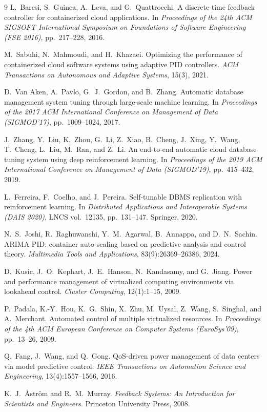 \documentclass[smallextended]{svjour3}
\begin{document}
\begin{thebibliography}{9}
L.\ Baresi, S.\ Guinea, A.\ Leva, and G.\ Quattrocchi.
\newblock A discrete-time feedback controller for containerized cloud
  applications.
\newblock In \emph{Proceedings of the 24th ACM SIGSOFT International
  Symposium on Foundations of Software Engineering (FSE 2016)}, pp.\
  217--228, 2016.

M.\ Sabuhi, N.\ Mahmoudi, and H.\ Khazaei.
\newblock Optimizing the performance of containerized cloud software
  systems using adaptive PID controllers.
\newblock \emph{ACM Transactions on Autonomous and Adaptive Systems},
  15(3), 2021.

D.\ Van Aken, A.\ Pavlo, G.\ J.\ Gordon, and B.\ Zhang.
\newblock Automatic database management system tuning through
  large-scale machine learning.
\newblock In \emph{Proceedings of the 2017 ACM International
  Conference on Management of Data (SIGMOD'17)}, pp.\ 1009--1024, 2017.

J.\ Zhang, Y.\ Liu, K.\ Zhou, G.\ Li, Z.\ Xiao, B.\ Cheng, J.\ Xing,
  Y.\ Wang, T.\ Cheng, L.\ Liu, M.\ Ran, and Z.\ Li.
\newblock An end-to-end automatic cloud database tuning system using
  deep reinforcement learning.
\newblock In \emph{Proceedings of the 2019 ACM International
  Conference on Management of Data (SIGMOD'19)}, pp.\ 415--432, 2019.

L.\ Ferreira, F.\ Coelho, and J.\ Pereira.
\newblock Self-tunable DBMS replication with reinforcement learning.
\newblock In \emph{Distributed Applications and Interoperable Systems
  (DAIS 2020)}, LNCS vol.\ 12135, pp.\ 131--147. Springer, 2020.

N.\ S.\ Joshi, R.\ Raghuwanshi, Y.\ M.\ Agarwal, B.\ Annappa, and
  D.\ N.\ Sachin.
\newblock ARIMA-PID: container auto scaling based on predictive
  analysis and control theory.
\newblock \emph{Multimedia Tools and Applications}, 83(9):26369--26386,
  2024.

D.\ Kusic, J.\ O.\ Kephart, J.\ E.\ Hanson, N.\ Kandasamy, and G.\ Jiang.
\newblock Power and performance management of virtualized computing
  environments via lookahead control.
\newblock \emph{Cluster Computing}, 12(1):1--15, 2009.

P.\ Padala, K.-Y.\ Hou, K.\ G.\ Shin, X.\ Zhu, M.\ Uysal, Z.\ Wang,
  S.\ Singhal, and A.\ Merchant.
\newblock Automated control of multiple virtualized resources.
\newblock In \emph{Proceedings of the 4th ACM European Conference on
  Computer Systems (EuroSys'09)}, pp.\ 13--26, 2009.

Q.\ Fang, J.\ Wang, and Q.\ Gong.
\newblock QoS-driven power management of data centers via model
  predictive control.
\newblock \emph{IEEE Transactions on Automation Science and
  Engineering}, 13(4):1557--1566, 2016.

K.\ J.\ {\AA}str\"om and R.\ M.\ Murray.
\newblock \emph{Feedback Systems: An Introduction for Scientists and
  Engineers}.
\newblock Princeton University Press, 2008.
\end{thebibliography}
\end{document}
